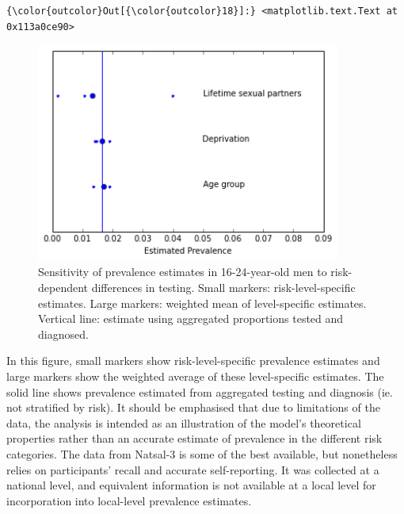 \documentclass{article}
\begin{document}
    \begin{footnotesize}
            \begin{Verbatim}[commandchars=\\\{\}]
{\color{outcolor}Out[{\color{outcolor}18}]:} <matplotlib.text.Text at 0x113a0ce90>
\end{Verbatim}
    \end{footnotesize}
        
    \begin{figure}
        \begin{center}\includegraphics[width=10cm]{three_compartment_model_files/three_compartment_model_25_1.png}\end{center}
        \caption{Sensitivity of prevalence estimates in 16-24-year-old men to risk-dependent differences in testing. Small markers: risk-level-specific estimates. Large markers: weighted mean of level-specific estimates. Vertical line: estimate using aggregated proportions tested and diagnosed.}
        \label{}
    \end{figure}
    
    In this figure, small markers show risk-level-specific prevalence
estimates and large markers show the weighted average of these
level-specific estimates. The solid line shows prevalence estimated from
aggregated testing and diagnosis (ie. not stratified by risk). It should
be emphasised that due to limitations of the data, the analysis is
intended as an illustration of the model's theoretical properties rather
than an accurate estimate of prevalence in the different risk
categories. The data from Natsal-3 is some of the best available, but
nonetheless relies on participants' recall and accurate self-reporting.
It was collected at a national level, and equivalent information is not
available at a local level for incorporation into local-level prevalence
estimates.
\end{document}
